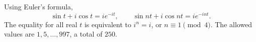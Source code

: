 Using Euler's formula,
\[
\sin t+i\cos t=i e^{-it},\qquad
\sin nt+i\cos nt=i e^{-int}.
\]
The equality for all real $t$ is equivalent to $i^n=i$, or $n\equiv1\pmod4$. The allowed values are $1,5,\ldots,997$, a total of $\boxed{250}$.
